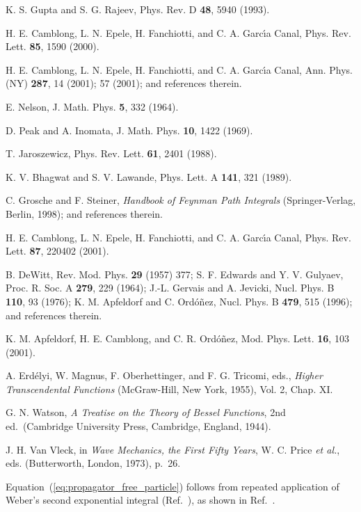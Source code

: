 \documentclass[a4paper,preprint,draft,showpacs,amsmath,amsfonts,amssymb,aps,prd]{revtex4}%
\begin{document}
\begin{thebibliography}{99}
K. S. Gupta and S. G. Rajeev,
Phys. Rev. D {\bf 48}, 5940 (1993). %

H. E. Camblong, L. N. Epele, H. Fanchiotti, and C. A. Garc\'{\i}a Canal, 
Phys. Rev. Lett. {\bf 85}, 1590 (2000).

H. E. Camblong, L. N. Epele, H. Fanchiotti, and C. A. Garc\'{\i}a
Canal,
Ann. Phys. (NY) {\bf 287}, 14 (2001);  57 (2001);
and references therein.

E. Nelson,
J. Math. Phys. {\bf 5}, 332 (1964).  

D. Peak and A. Inomata, 
J. Math. Phys. {\bf 10}, 1422 (1969).  

T. Jaroszewicz, Phys. Rev. Lett.
{\bf 61}, 2401 (1988).

K. V. Bhagwat and S. V. Lawande,
Phys. Lett. A {\bf 141}, 321 (1989).

C. Grosche and F. Steiner,  %
{\it Handbook of Feynman Path Integrals\/}
(Springer-Verlag, Berlin, 1998);
and references therein.

H. E. Camblong, L. N. Epele, H. Fanchiotti, and C. A. Garc\'{\i}a
Canal, 
 Phys. Rev. Lett. {\bf 87}, 220402  (2001).

B. DeWitt, Rev. Mod. Phys.
{\bf 29} (1957) 377;
S. F. Edwards and Y. V. Gulyaev, 
Proc. R. Soc. A {\bf 279}, 229 (1964);
J.-L. Gervais and  A. Jevicki, 
Nucl. Phys. B {\bf 110}, 93 (1976); 
K. M. Apfeldorf
 and C. Ord\'o\~nez, 
Nucl. Phys. B {\bf 479}, 515 (1996);
and references therein.

K. M. Apfeldorf,
H. E. Camblong, and C. R. Ord\'{o}\~{n}ez,
Mod. Phys. Lett. {\bf 16}, 103 (2001).

A. Erd\'{e}lyi, W. Magnus, F. Oberhettinger, and F. G.
 Tricomi, eds.,
{\em Higher Transcendental Functions\/}
(McGraw-Hill, New York, 1955), Vol. 2, Chap. XI.

G. N. Watson, {\em A Treatise on the Theory of Bessel Functions\/},
2nd ed.\
(Cambridge University Press, Cambridge, England, 1944).

J. H. Van Vleck, in {\em Wave Mechanics, the First Fifty Years\/},
W. C. Price {\em et al.\/}, eds.
(Butterworth, London, 1973), p.\ 26.

Equation~(\ref{eq:propagator_free_particle})
follows from repeated application of Weber's second exponential integral
(Ref.~\cite{wat:44}), as shown in Ref.~\cite{pea:69}. 


\end{thebibliography}
\end{document}
